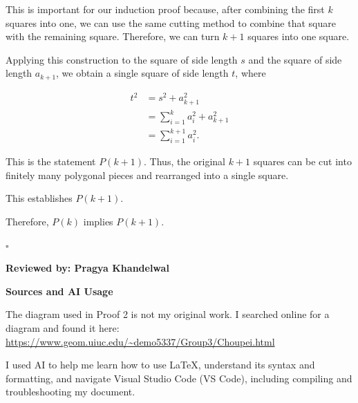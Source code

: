 \documentclass[12pt]{article}
\begin{document}
This is important for our induction proof
because, after combining the first $k$ squares
into one, we can use the same cutting method
to combine that square with the remaining
square. Therefore, we can turn $k+1$ squares
into one square.

Applying this construction to the square
of side length $s$ and the square of side
length $a_{k+1}$, we obtain a single square
of side length $t$, where

\[
\begin{aligned}
t^2
&=s^2+a_{k+1}^2\\
&=\sum_{i=1}^{k}a_i^2+a_{k+1}^2\\
&=\sum_{i=1}^{k+1}a_i^2.
\end{aligned}
\]

This is the statement $P(k+1)$.
Thus, the original $k+1$ squares can be
cut into finitely many polygonal pieces
and rearranged into a single square.

This establishes $P(k+1)$.

Therefore, $P(k)$ implies $P(k+1)$.

\hfill $\square$

\vspace{0.5cm}

\textbf{Reviewed by: Pragya Khandelwal}


\vspace{0.5cm}

\textbf{Sources and AI Usage}

The diagram used in Proof 2 is not my original work.
I searched online for a diagram and found it here:
\url{https://www.geom.uiuc.edu/~demo5337/Group3/Choupei.html}

I used AI to help me learn how to use LaTeX,
understand its syntax and formatting, and navigate
Visual Studio Code (VS Code), including compiling
and troubleshooting my document.
\end{document}

